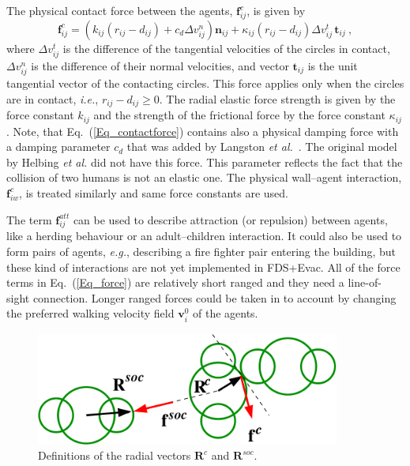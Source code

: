 \documentclass[12pt,a4paper,final,twoside]{stylevk}
\begin{document}
The physical contact force between the agents, $\mathbf{f}_{ij}^{c}$,
is given by
%
\begin{equation}\label{Eq_contactforce}
  \mathbf{f}_{ij}^{c} = \left( k_{ij} (r_{ij}-d_{ij}) + c_d \Delta
    v_{ij}^{n} \right) \mathbf{n}_{ij} + \kappa_{ij} (r_{ij}-d_{ij})\Delta
  v_{ij}^{t} \, \mathbf{t}_{ij} ~,
\end{equation}
%
where $\Delta v_{ij}^{t}$ is the difference of the tangential
velocities of the circles in contact, $\Delta v_{ij}^{n}$ is the
difference of their normal velocities, and vector $\mathbf{t}_{ij}$ is
the unit tangential vector of the contacting circles.  This force
applies only when the circles are in contact, \emph{i.e.},
$r_{ij}-d_{ij} \ge 0$.  The radial elastic force strength is given by
the force constant $k_{ij}$ and the strength of the frictional force
by the force constant $\kappa_{ij}$.  Note, that
Eq.~(\ref{Eq_contactforce}) contains also a physical damping force with
a damping parameter $c_d$ that was added by Langston \emph{et
  al.}~\cite{Langston06}.  The original model by Helbing {\em et al.}
did not have this force.  This parameter reflects the fact that the
collision of two humans is not an elastic one.  The physical
wall--agent interaction, $ \mathbf{f}^{c}_{iw}$, is treated similarly
and same force constants are used.


The term $\mathbf{f}_{ij}^{att}$ can be used to describe attraction
(or repulsion) between agents, like a herding behaviour or an
adult--children interaction.  It could also be used to form pairs of
agents, \emph{e.g.}, describing a fire fighter pair entering the
building, but these kind of interactions are not yet implemented in
FDS+Evac.  All of the force terms in Eq.~(\ref{Eq_force}) are
relatively short ranged and they need a line-of-sight connection.
Longer ranged forces could be taken in to account by changing the
preferred walking velocity field $ \mathbf{v}_i^0 $ of the agents.

%
\begin{figure}[!bt]
  \centerline{\includegraphics[clip=true, width=100mm]{FIGURES/body_shape_forces} }
\caption{Definitions of the radial vectors $\mathbf{R}^c$ and
  $\mathbf{R}^{soc}$. }\label{Fig_BodySize} 
\end{figure}
%
\end{document}
